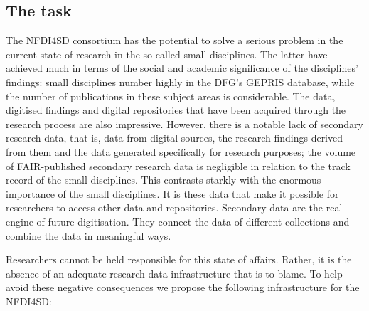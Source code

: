 \documentclass[
  english,
  paper=a4,
  oneside,captions=tableheading
]{scrbook}
\begin{document}
\hypertarget{the-task}{%
\subsection{The task}\label{the-task}}

The NFDI4SD consortium has the potential to solve a serious problem in
the current state of research in the so-called small disciplines. The
latter have achieved much in terms of the social and academic
significance of the disciplines' findings: small disciplines number
highly in the DFG's GEPRIS database, while the number of publications in
these subject areas is considerable. The data, digitised findings and
digital repositories that have been acquired through the research
process are also impressive. However, there is a notable lack of
secondary research data, that is, data from digital sources, the
research findings derived from them and the data generated specifically
for research purposes; the volume of FAIR-published secondary research
data is negligible in relation to the track record of the small
disciplines. This contrasts starkly with the enormous importance of the
small disciplines. It is these data that make it possible for
researchers to access other data and repositories. Secondary data are
the real engine of future digitisation. They connect the data of
different collections and combine the data in meaningful ways.

Researchers cannot be held responsible for this state of affairs.
Rather, it is the absence of an adequate research data infrastructure
that is to blame. To help avoid these negative consequences we propose
the following infrastructure for the NFDI4SD:
\end{document}
